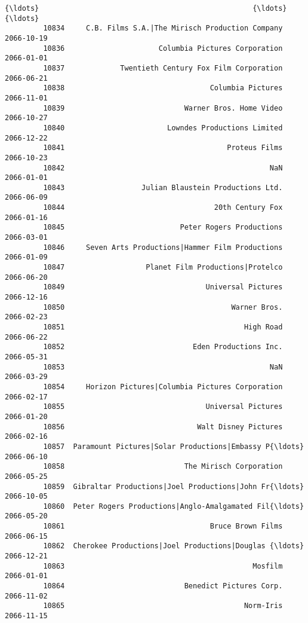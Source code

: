 \documentclass[11pt]{article}
\begin{document}
\begin{Verbatim}[commandchars=\\\{\}]
         {\ldots}                                                  {\ldots}          {\ldots}   
         10834     C.B. Films S.A.|The Mirisch Production Company   2066-10-19   
         10836                      Columbia Pictures Corporation   2066-01-01   
         10837             Twentieth Century Fox Film Corporation   2066-06-21   
         10838                                  Columbia Pictures   2066-11-01   
         10839                            Warner Bros. Home Video   2066-10-27   
         10840                        Lowndes Productions Limited   2066-12-22   
         10841                                      Proteus Films   2066-10-23   
         10842                                                NaN   2066-01-01   
         10843                  Julian Blaustein Productions Ltd.   2066-06-09   
         10844                                   20th Century Fox   2066-01-16   
         10845                           Peter Rogers Productions   2066-03-01   
         10846     Seven Arts Productions|Hammer Film Productions   2066-01-09   
         10847                   Planet Film Productions|Protelco   2066-06-20   
         10849                                 Universal Pictures   2066-12-16   
         10850                                       Warner Bros.   2066-02-23   
         10851                                          High Road   2066-06-22   
         10852                              Eden Productions Inc.   2066-05-31   
         10853                                                NaN   2066-03-29   
         10854     Horizon Pictures|Columbia Pictures Corporation   2066-02-17   
         10855                                 Universal Pictures   2066-01-20   
         10856                               Walt Disney Pictures   2066-02-16   
         10857  Paramount Pictures|Solar Productions|Embassy P{\ldots}   2066-06-10   
         10858                            The Mirisch Corporation   2066-05-25   
         10859  Gibraltar Productions|Joel Productions|John Fr{\ldots}   2066-10-05   
         10860  Peter Rogers Productions|Anglo-Amalgamated Fil{\ldots}   2066-05-20   
         10861                                  Bruce Brown Films   2066-06-15   
         10862  Cherokee Productions|Joel Productions|Douglas {\ldots}   2066-12-21   
         10863                                            Mosfilm   2066-01-01   
         10864                            Benedict Pictures Corp.   2066-11-02   
         10865                                          Norm-Iris   2066-11-15   
         

\end{Verbatim}
\end{document}

